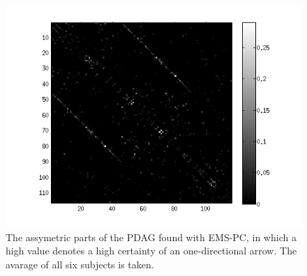 \documentclass[a4paper, 10pt, english, onecolumn]{article}
\makeatletter
\renewcommand{\paragraph}{%
  \@startsection{paragraph}{4}%
  {\z@}{0.5ex \@plus 1ex \@minus .2ex}{-1em}%
  {\normalfont\normalsize\bfseries}%
}
\makeatother
\begin{document}
\begin{figure}[h!]
  \centering
  \includegraphics{images/PDAG_avg_antisymmetric_expl}
  \caption{The assymetric parts of the PDAG found with EMS-PC, in which a high value denotes a high certainty of an one-directional arrow. The avarage of all six subjects is taken.}
  \label{fig:pdag_avg_antisymmetric_ems}
\end{figure}


\end{document}
